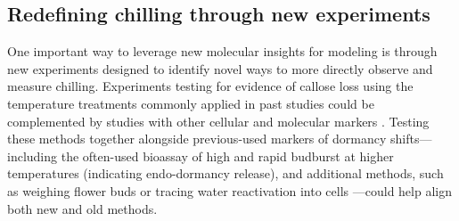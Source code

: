 \documentclass[11pt]{article}
\begin{document}
\subsection*{Redefining chilling through new experiments} 
One important way to leverage new molecular insights for modeling is through new experiments designed to identify novel ways to more directly observe and measure chilling. %
Experiments testing for evidence of callose loss using the temperature treatments commonly applied in past studies \citep{ospreebbms} could be complemented by studies with other cellular and molecular markers \citep{yu2024building}. Testing these methods together alongside previous-used markers of dormancy shifts---including the often-used bioassay of high and rapid budburst at higher temperatures (indicating endo-dormancy release), and additional methods, such as weighing flower buds \citep{chuine2016} or tracing water reactivation into cells \citep{faust1991bound,Kalcsits2009,walde2024stable}---could help align both new and old methods. %
\end{document}
